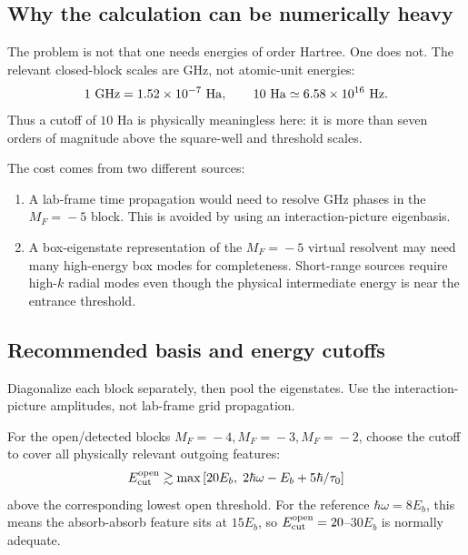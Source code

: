 \documentclass[11pt,a4paper]{article}
\newcommand{\MF}[1]{M_F\!=\!#1}
\begin{document}
\subsection{Why the calculation can be numerically heavy}

The problem is not that one needs energies of order Hartree.  One does not.
The relevant closed-block scales are GHz, not atomic-unit energies:
\begin{equation}
1\ {\rm GHz}=1.52\times10^{-7}\ {\rm Ha},
\qquad
10\ {\rm Ha}\simeq6.58\times10^{16}\ {\rm Hz}.
\end{equation}
Thus a cutoff of $10$ Ha is physically meaningless here: it is more than seven
orders of magnitude above the square-well and threshold scales.

The cost comes from two different sources:
\begin{enumerate}[leftmargin=2em,itemsep=2pt]
\item A lab-frame time propagation would need to resolve GHz phases in the
$\MF{-5}$ block.  This is avoided by using an interaction-picture eigenbasis.
\item A box-eigenstate representation of the $\MF{-5}$ virtual resolvent may
need many high-energy box modes for completeness.  Short-range sources require
high-$k$ radial modes even though the physical intermediate energy is near the
entrance threshold.
\end{enumerate}

\subsection{Recommended basis and energy cutoffs}

Diagonalize each block separately, then pool the eigenstates.  Use the
interaction-picture amplitudes, not lab-frame grid propagation.

For the open/detected blocks $\MF{-4},\MF{-3},\MF{-2}$, choose the cutoff to
cover all physically relevant outgoing features:
\begin{equation}
E_{\rm cut}^{\rm open}\gtrsim
\max\left[20E_b,\;2\hbar\omega-E_b+5\hbar/\tau_0\right]
\end{equation}
above the corresponding lowest open threshold.  For the reference
$\hbar\omega=8E_b$, this means the absorb-absorb feature sits at
$15E_b$, so $E_{\rm cut}^{\rm open}=20$--$30E_b$ is normally adequate.
\end{document}

